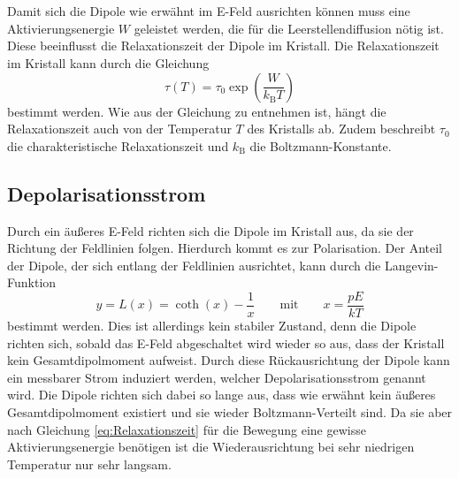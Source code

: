 \\\\
Damit sich die Dipole wie erwähnt im E-Feld ausrichten können muss eine Aktivierungsenergie $W$ geleistet werden, die für die Leerstellendiffusion nötig ist.
Diese beeinflusst die Relaxationszeit der Dipole im Kristall.
Die Relaxationszeit im Kristall kann durch die Gleichung 
\begin{equation}
    \tau(T) = \tau_0 \exp( \frac{W}{k_\text{B} T})
    \label{eq:Relaxationszeit}
\end{equation}
bestimmt werden.
Wie aus der Gleichung zu entnehmen ist, hängt die Relaxationszeit auch von der Temperatur $T$ des Kristalls ab.
Zudem beschreibt $\tau_0$ die charakteristische Relaxationszeit und $k_\text{B}$ die Boltzmann-Konstante.

\subsection{Depolarisationsstrom}
Durch ein äußeres E-Feld richten sich die Dipole im Kristall aus, da sie der Richtung der Feldlinien folgen.
Hierdurch kommt es zur Polarisation.
Der Anteil der Dipole, der sich entlang der Feldlinien ausrichtet, kann durch die Langevin-Funktion
\begin{equation}
    y = L(x) = \coth(x)-\frac{1}{x} \qquad \text{mit} \qquad x=\frac{pE}{kT}
    \label{eq:Langevin}
\end{equation}
bestimmt werden.
Dies ist allerdings kein stabiler Zustand, denn die Dipole richten sich, sobald das E-Feld abgeschaltet wird wieder so aus, dass der Kristall kein Gesamtdipolmoment aufweist.
Durch diese Rückausrichtung der Dipole kann ein messbarer Strom induziert werden, welcher Depolarisationsstrom genannt wird.
Die Dipole richten sich dabei so lange aus, dass wie erwähnt kein äußeres Gesamtdipolmoment existiert und sie wieder Boltzmann-Verteilt sind.
Da sie aber nach Gleichung \eqref{eq:Relaxationszeit} für die Bewegung eine gewisse Aktivierungsenergie benötigen ist die Wiederausrichtung bei sehr niedrigen Temperatur nur sehr langsam.

